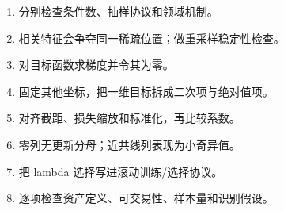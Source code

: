 \begin{enumerate}[leftmargin=*]
  \item 分别检查条件数、抽样协议和领域机制。
  \item 相关特征会争夺同一稀疏位置；做重采样稳定性检查。
  \item 对目标函数求梯度并令其为零。
  \item 固定其他坐标，把一维目标拆成二次项与绝对值项。
  \item 对齐截距、损失缩放和标准化，再比较系数。
  \item 零列无更新分母；近共线列表现为小奇异值。
  \item 把 lambda 选择写进滚动训练/选择协议。
  \item 逐项检查资产定义、可交易性、样本量和识别假设。
\end{enumerate}
